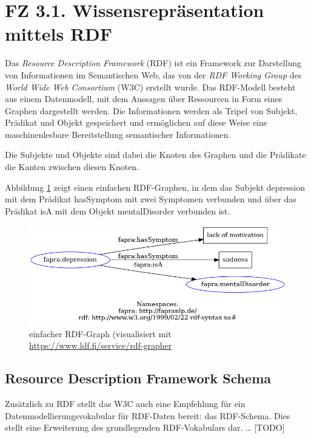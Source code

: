 %
%
\section{FZ 3.1. Wissensrepräsentation mittels RDF}
\label{sec:fz3.1.} 

Das \emph{Resource Description Framework} (RDF) \cite{w3c_all_2022} ist ein Framework zur Darstellung von Informationen im Semantischen Web, das von der \emph{RDF Working Group} des  \emph{World Wide Web Consortium} (W3C) erstellt wurde. Das RDF-Modell besteht aus einem Datenmodell, mit dem Aussagen über Ressourcen in Form eines Graphen dargestellt werden. Die Informationen werden als Tripel von Subjekt, Prädikat und Objekt gespeichert und ermöglichen auf diese Weise eine maschinenlesbare Bereitstellung semantischer Informationen.

Die Subjekte und Objekte sind dabei die Knoten des Graphen und die Prädikate die Kanten zwischen diesen Knoten.

Abbildung \ref{fig:rdfgraph} zeigt einen einfachen RDF-Graphen, in dem das Subjekt \glqq depression\grqq{} mit dem Prädikat \glqq hasSymptom\grqq{} mit zwei Symptomen verbunden und über das Prädikat \glqq isA\grqq{} mit dem Objekt \glqq mentalDisorder\grqq{} verbunden ist.

\begin{figure}[h]
    \centering
    \includegraphics[width=\textwidth]{pictures/rdf-graph.png}
    \caption{einfacher RDF-Graph (visualisiert mit \url{https://www.ldf.fi/service/rdf-grapher}}
    \label{fig:rdfgraph}
\end{figure}

\subsection{Resource Description Framework Schema}

Zusätzlich zu RDF stellt das W3C auch eine Empfehlung für ein Datenmodellierungsvokabular für RDF-Daten bereit: das RDF-Schema. Dies stellt eine Erweiterung des grundlegenden RDF-Vokabulars dar. \dots{} [TODO]

